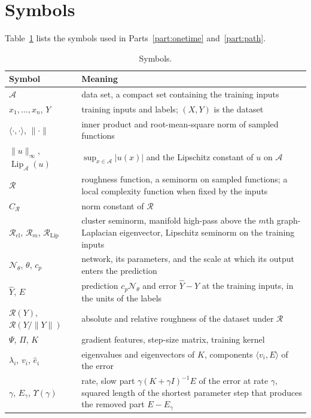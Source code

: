 \documentclass[11pt]{article}
\theoremstyle{definition}
\theoremstyle{remark}
\newcommand{\Aset}{\mathcal{A}}          %
\newcommand{\Net}{\mathcal{N}_\theta}    %
\newcommand{\Lip}{\operatorname{Lip}_{\Aset}}
\newcommand{\supA}[1]{\|#1\|_{\infty}}
\newcommand{\Rgh}{\mathcal{R}}           %
\newcommand{\Lipn}{\Rgh_{\mathrm{Lip}}}  %
\newcommand{\CR}{C_{\Rgh}}
\newcommand{\ip}[2]{\langle #1,#2\rangle}
\begin{document}
\appendix
\section{Symbols}\label{app:symbols}

Table~\ref{tab:symbols} lists the symbols used in Parts~\ref{part:onetime} and~\ref{part:path}.

\begin{table}[H]
\centering
\caption{Symbols.}\label{tab:symbols}
\footnotesize
\renewcommand{\arraystretch}{0.9}
\begin{tabular}{@{}p{}p{}@{}}
\toprule
Symbol & Meaning \\
\midrule
$\Aset$ & data set, a compact set containing the training inputs \\
$x_1,\dots,x_n$, $Y$ & training inputs and labels; $(X,Y)$ is the dataset \\
$\ip{\cdot}{\cdot}$, $\|\cdot\|$ & inner product and root-mean-square norm of sampled functions \\
$\supA{u}$, $\Lip(u)$ & $\sup_{x\in\Aset}|u(x)|$ and the Lipschitz constant of $u$ on $\Aset$ \\
$\Rgh$ & roughness function, a seminorm on sampled functions; a local complexity function when fixed by the inputs \\
$\CR$ & norm constant of $\Rgh$ \\
$\Rgh_{\mathrm{cl}}$, $\Rgh_m$, $\Lipn$ & cluster seminorm, manifold high-pass above the $m$th graph-Laplacian eigenvector, Lipschitz seminorm on the training inputs \\
$\Net$, $\theta$, $c_p$ & network, its parameters, and the scale at which its output enters the prediction \\
$\hat Y$, $E$ & prediction $c_p\Net$ and error $\hat Y - Y$ at the training inputs, in the units of the labels \\
$\Rgh(Y)$, $\Rgh(Y/\|Y\|)$ & absolute and relative roughness of the dataset under $\Rgh$ \\
$\Psi$, $\Pi$, $K$ & gradient features, step-size matrix, training kernel \\
$\lambda_i$, $v_i$, $\hat e_i$ & eigenvalues and eigenvectors of $K$, components $\ip{v_i}{E}$ of the error \\
$\gamma$, $E_\gamma$, $\Upsilon(\gamma)$ & rate, slow part $\gamma(K+\gamma I)^{-1}E$ of the error at rate $\gamma$, squared length of the shortest parameter step that produces the removed part $E - E_\gamma$ \\

\end{tabular}
\end{table}
\end{document}
